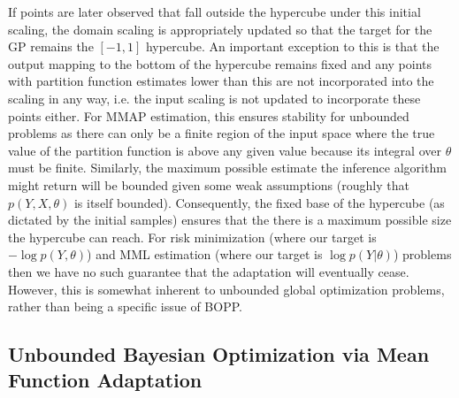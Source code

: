 If points are later observed that fall outside the hypercube under this initial scaling, the domain scaling 
is appropriately updated so that the target for the GP remains the $[-1,1]$ hypercube.  
An important exception to this is that the output mapping to the bottom of the hypercube remains 
fixed and any points with partition function estimates lower than this are not incorporated into the scaling in any way,
i.e. the input scaling is not updated to incorporate these points either.
For MMAP estimation, this ensures stability for unbounded problems as there can only be a finite region
of the input space where the true value of the partition function is above any given value because its integral
over $\theta$ must be finite.  Similarly, the
maximum possible estimate the inference algorithm might return will be bounded
given some weak assumptions (roughly that $p(Y,X,\theta)$ is itself bounded).
Consequently, the fixed base of the hypercube (as dictated by the initial samples) ensures that the 
there is a maximum possible size the hypercube can reach.
For risk minimization (where our target is $-\log p(Y,\theta)$) and  MML estimation
(where our target is $\log p(Y|\theta)$) problems then we have no such guarantee that the adaptation will 
eventually cease.  However, this is somewhat inherent to unbounded global optimization problems,
rather than being a specific issue of BOPP.

\subsection{Unbounded Bayesian Optimization via Mean Function Adaptation}
\label{sec:bopp:unbounded}

